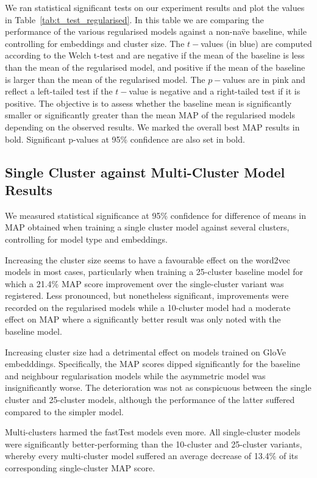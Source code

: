 We ran statistical significant tests on our experiment results and plot the values in Table~\ref{tab:t_test_regularised}.  In this table we are comparing the performance of the various regularised models against a non-na\"ve baseline, while controlling for embeddings and cluster size.  The $t-$values (in blue) are computed according to the Welch t-test and are negative if the mean of the baseline is less than the mean of the regularised model, and positive if the mean of the baseline is larger than the mean of the regularised model.  The $p-$values are in pink and reflect a left-tailed test if the $t-$value is negative and a right-tailed test if it is positive.  The objective is to assess whether the baseline mean is significantly smaller or significantly greater than the mean MAP of the regularised models depending on the observed results.  We marked the overall best \ac{MAP} results in bold. Significant p-values at 95\% confidence are also set in bold.

\subsection{Single Cluster against Multi-Cluster Model Results}
We measured statistical significance at 95\% confidence for difference of means in \ac{MAP} obtained when training a single cluster model against several clusters, controlling for model type and embeddings.  

Increasing the cluster size seems to have a favourable effect on the word2vec models in most cases, particularly when training a 25-cluster baseline model for which a 21.4\% \ac{MAP} score improvement over the single-cluster variant was registered.  Less pronounced, but nonetheless significant, improvements were recorded on the regularised models while a 10-cluster model had a moderate effect on \ac{MAP} where a significantly better result was only noted with the baseline model.  

Increasing cluster size had a detrimental effect on models trained on GloVe embedddings.  Specifically, the \ac{MAP} scores dipped significantly for the baseline and neighbour regularisation models while the asymmetric model was insignificantly worse.  The deterioration was not as conspicuous between the single cluster and 25-cluster models, although the performance of the latter suffered compared to the simpler model.  

Multi-clusters harmed the fastTest models even more.  All single-cluster models were significantly better-performing than the 10-cluster and 25-cluster variants, whereby every multi-cluster model suffered an average decrease of 13.4\% of its corresponding single-cluster \ac{MAP} score.

